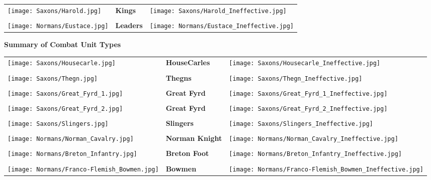 \begin{tabularx}{0.5\textwidth}{
    >{\raggedright\arraybackslash}X
    >{\centering\arraybackslash}X
    >{\raggedleft\arraybackslash}X}
    \texttt{[image: Saxons/Harold.jpg]} &
    \textbf{Kings} &
    \texttt{[image: Saxons/Harold\_Ineffective.jpg]} \\ \\
    \texttt{[image: Normans/Eustace.jpg]} &
    \textbf{Leaders} &
    \texttt{[image: Normans/Eustace\_Ineffective.jpg]}
\end{tabularx}

\par
\begin{center}
  \textbf{Summary of Combat Unit Types}
  \break
\end{center}

\begin{tabularx}{0.5\textwidth}{
    >{\raggedright\arraybackslash}X
    >{\centering\arraybackslash}X
    >{\raggedleft\arraybackslash}X}

  \texttt{[image: Saxons/Housecarle.jpg]} & \textbf{HouseCarles} & \texttt{[image: Saxons/Housecarle\_Ineffective.jpg]} \\ \\
  \texttt{[image: Saxons/Thegn.jpg]} & \textbf{Thegns} & \texttt{[image: Saxons/Thegn\_Ineffective.jpg]} \\ \\
  \texttt{[image: Saxons/Great\_Fyrd\_1.jpg]} & \textbf{Great Fyrd} & \texttt{[image: Saxons/Great\_Fyrd\_1\_Ineffective.jpg]} \\ \\
  \texttt{[image: Saxons/Great\_Fyrd\_2.jpg]} & \textbf{Great Fyrd} & \texttt{[image: Saxons/Great\_Fyrd\_2\_Ineffective.jpg]} \\ \\
  \texttt{[image: Saxons/Slingers.jpg]} & \textbf{Slingers} & \texttt{[image: Saxons/Slingers\_Ineffective.jpg]} \\ \\
  \texttt{[image: Normans/Norman\_Cavalry.jpg]} & \textbf{Norman Knight} & \texttt{[image: Normans/Norman\_Cavalry\_Ineffective.jpg]} \\ \\
  \texttt{[image: Normans/Breton\_Infantry.jpg]} & \textbf{Breton Foot} & \texttt{[image: Normans/Breton\_Infantry\_Ineffective.jpg]} \\ \\
  \texttt{[image: Normans/Franco-Flemish\_Bowmen.jpg]} & \textbf{Bowmen} & \texttt{[image: Normans/Franco-Flemish\_Bowmen\_Ineffective.jpg]}
\end{tabularx}

